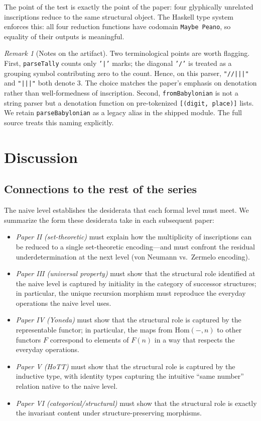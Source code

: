 \documentclass[12pt]{article}
\theoremstyle{definition}
\theoremstyle{remark}
\newtheorem{remark}[theorem]{Remark}
\begin{document}
The point of the test is exactly the point of the paper: four glyphically
unrelated inscriptions reduce to the same structural object. The
Haskell type system enforces this: all four reduction functions have
codomain \texttt{Maybe Peano}, so equality of their outputs is
meaningful.

\begin{remark}[Notes on the artifact]
\label{rem:artifact-notes}
Two terminological points are worth flagging. First, \texttt{parseTally}
counts only \texttt{'|'} marks; the diagonal \texttt{'/'} is treated as
a grouping symbol contributing zero to the count. Hence, on this
parser, \texttt{"//|||"} and \texttt{"|||"} both denote 3. The choice
matches the paper's emphasis on denotation rather than well-formedness
of inscription. Second, \texttt{fromBabylonian} is not a string parser
but a denotation function on pre-tokenized \texttt{[(digit, place)]}
lists. We retain \texttt{parseBabylonian} as a legacy alias in the
shipped module. The full source treats this naming explicitly.
\end{remark}

\section{Discussion}
\label{sec:discussion}

\subsection{Connections to the rest of the series}

The naive level establishes the desiderata that each formal level must
meet. We summarize the form these desiderata take in each subsequent
paper:

\begin{itemize}
\item \emph{Paper II (set-theoretic)} must explain how the multiplicity
of inscriptions can be reduced to a single set-theoretic encoding---and
must confront the residual underdetermination at the next level (von
Neumann vs.\ Zermelo encoding).
\item \emph{Paper III (universal property)} must show that the
structural role identified at the naive level is captured by initiality
in the category of successor structures; in particular, the unique
recursion morphism must reproduce the everyday operations the naive
level uses.
\item \emph{Paper IV (Yoneda)} must show that the structural role is
captured by the representable functor; in particular, the maps from
$\mathrm{Hom}(-, n)$ to other functors $F$ correspond to elements of
$F(n)$ in a way that respects the everyday operations.
\item \emph{Paper V (HoTT)} must show that the structural role is
captured by the inductive type, with identity types capturing the
intuitive ``same number'' relation native to the naive level.
\item \emph{Paper VI (categorical/structural)} must show that the
structural role is exactly the invariant content under
structure-preserving morphisms.
\end{itemize}
\end{document}
